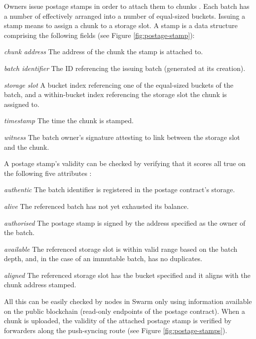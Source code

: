 Owners issue postage stamps in order to attach them to chunks%
. Each batch has a number of  effectively arranged into a number of equal-sized buckets. Issuing a stamp means to assign a chunk to a storage slot. A stamp is a data structure comprising the following fields (see Figure  \ref{fig:postage-stamp}):

\begin{labelledlist}
    \item[\emph{chunk address}] The address of the chunk the stamp is attached to. 
    \item[\emph{batch identifier}]  The ID referencing the issuing batch (generated at its creation).
    \item[\emph{storage slot}] A bucket index referencing one of the equal-sized buckets of the batch, and a within-bucket index referencing the storage slot the chunk is assigned to.
    \item[\emph{timestamp}] The time the chunk is stamped. 
    \item[\emph{witness}] The batch owner's signature attesting to link between the storage slot and the chunk.
\end{labelledlist}

A postage stamp's validity can be checked by verifying that it scores all true on the following five attributes%
:

\begin{labelledlist}
\item[\emph{authentic}] The batch identifier is registered in the postage contract's storage.
\item[\emph{alive}] The referenced batch has not yet exhausted its balance.
\item[\emph{authorised}] The postage stamp is signed by the address specified as the owner of the batch. 
\item[\emph{available}] The referenced storage slot is within valid range based on the batch depth, and, in the case of an immutable batch, has no duplicates.
\item[\emph{aligned}] The referenced storage slot has the bucket specified and it aligns with the chunk address stamped.
\end{labelledlist}

All this can be easily checked by nodes in Swarm only using information available on the public blockchain (read-only endpoints of the postage contract). When a chunk is uploaded, the validity of the attached postage stamp is verified by forwarders along the push-syncing route  (see Figure \ref{fig:postage-stamps}).


